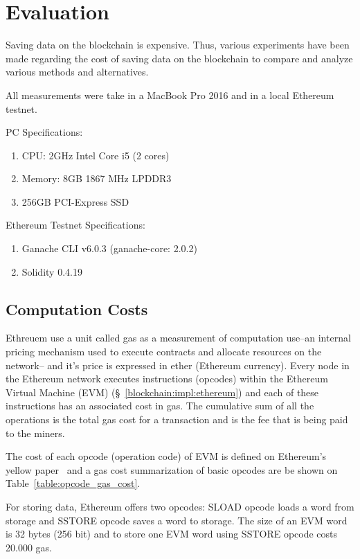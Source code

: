 \chapter{Evaluation}
\label{evaluation}

Saving data on the blockchain is expensive. Thus, various experiments have been made regarding the cost of saving data on the blockchain to compare and analyze various methods and alternatives.

All measurements were take in a MacBook Pro 2016 and in a local Ethereum testnet.

PC Specifications:

\begin{enumerate}
  \item CPU: 2GHz Intel Core i5 (2 cores)
  \item Memory: 8GB 1867 MHz LPDDR3
  \item 256GB PCI-Express SSD
\end{enumerate}

Ethereum Testnet Specifications:

\begin{enumerate}
  \item Ganache CLI v6.0.3 (ganache-core: 2.0.2)
  \item Solidity 0.4.19
\end{enumerate}

\section{Computation Costs}
\label{evaluation:computation_costs}

Ethreuem use a unit called gas as a measurement of computation use--an internal pricing mechanism used to execute contracts and allocate resources on the network-- and it's price is expressed in ether (Ethereum currency). Every node in the Ethereum network executes instructions (opcodes) within the Ethereum Virtual Machine (EVM) (§~\ref{blockchain:impl:ethereum}) and each of these instructions has an associated cost in gas. The cumulative sum of all the operations is the total gas cost for a transaction and is the fee that is being paid to the miners.

The cost of each opcode (operation code) of EVM is defined on Ethereum's yellow paper~\cite{ethereum_yellowpaper} and a gas cost summarization of basic opcodes are be shown on Table~\ref{table:opcode_gas_cost}.

For storing data, Ethereum offers two opcodes: SLOAD opcode loads a word from storage and SSTORE opcode saves a word to storage. The size of an EVM word is 32 bytes (256 bit) and to store one EVM word using SSTORE opcode costs 20.000 gas.

